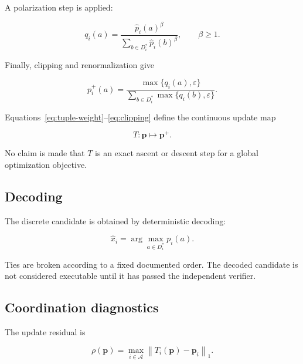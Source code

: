 \documentclass[pdflatex,sn-mathphys-num,iicol,oneside]{sn-jnl}
\begin{document}
A polarization step is applied:

\begin{equation}
q_i(a)
=
\frac{
\widehat{p}_i(a)^{\beta}
}{
\displaystyle
\sum_{b\in D_i^{*}}
\widehat{p}_i(b)^{\beta}
},
\qquad
\beta\geq 1.
\label{eq:polarization}
\end{equation}

Finally, clipping and renormalization give

\begin{equation}
p_i^{+}(a)
=
\frac{
\max\{q_i(a),\varepsilon\}
}{
\displaystyle
\sum_{b\in D_i^{*}}
\max\{q_i(b),\varepsilon\}
}.
\label{eq:clipping}
\end{equation}

Equations~\eqref{eq:tuple-weight}--\eqref{eq:clipping} define the
continuous update map

\begin{equation}
T:\bm{p}\mapsto\bm{p}^{+}.
\end{equation}

No claim is made that $T$ is an exact ascent or descent step for a
global optimization objective.

\subsection{Decoding}

The discrete candidate is obtained by deterministic decoding:

\begin{equation}
\widehat{x}_i
=
\arg\max_{a\in D_i^{*}}p_i(a).
\label{eq:decode}
\end{equation}

Ties are broken according to a fixed documented order. The decoded
candidate is not considered executable until it has passed the
independent verifier.

\subsection{Coordination diagnostics}

The update residual is

\begin{equation}
\rho(\bm{p})
=
\max_{i\in\mathcal{A}}
\left\|
T_i(\bm{p})-\bm{p}_i
\right\|_1.
\label{eq:residual}
\end{equation}
\end{document}
